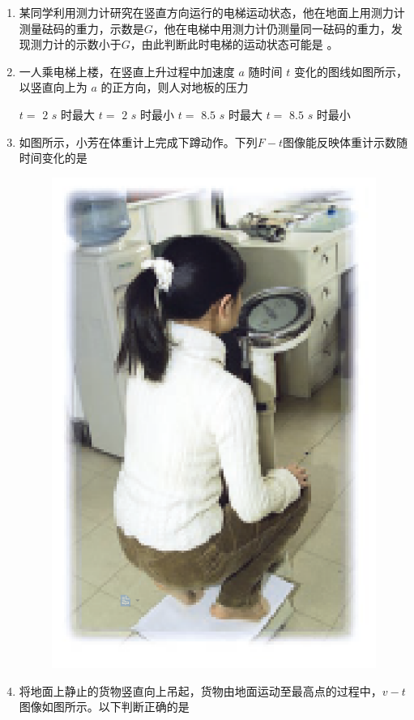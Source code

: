 
\begin{enumerate}[leftmargin=0em]
\renewcommand{\labelenumi}{\arabic{enumi}.}
\item
{}
某同学利用测力计研究在竖直方向运行的电梯运动状态，他在地面上用测力计测量砝码的重力，示数是$ G $，他在电梯中用测力计仍测量同一砝码的重力，发现测力计的示数小于$ G $，由此判断此时电梯的运动状态可能是  。



\item 
{}
一人乘电梯上楼，在竖直上升过程中加速度 $ a $ 随时间 $ t $ 变化的图线如图所示，以竖直向上为 $ a $ 的正方向，则人对地板的压力 
\begin{figure}[h!]
\centering

\end{figure}


\fourchoices
{$ t= $ $ 2 $ $ s $ 时最大}
{$ t= $ $ 2 $ $ s $ 时最小}
{$ t= $ $ 8.5 $ $ s $ 时最大}
{$ t= $ $ 8.5 $ $ s $ 时最小}



\item 
{}
如图所示，小芳在体重计上完成下蹲动作。下列$ F-t $图像能反映体重计示数随时间变化的是 


\begin{figure}[h!]
\centering
\includegraphics[width=0.15\linewidth]{picture/screenshot001} \quad 

\end{figure}



\item 
{}
将地面上静止的货物竖直向上吊起，货物由地面运动至最高点的过程中，$ v-t $ 图像如图所示。以下判断正确的是 
\begin{figure}[h!]
\centering

\end{figure}


\end{enumerate}
